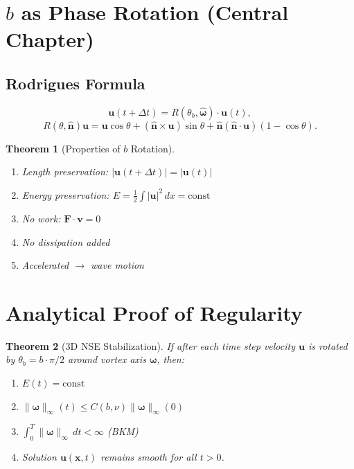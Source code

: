 \documentclass[11pt,a4paper]{article}
\newtheorem{theorem}{Theorem}[section]
\begin{document}
\section{$b$ as Phase Rotation (Central Chapter)}

\subsection{Rodrigues Formula}

\begin{equation}
\mathbf{u}(t+\Delta t) = R(\theta_b, \hat{\boldsymbol{\omega}})\cdot\mathbf{u}(t),
\end{equation}
\begin{equation}
R(\theta, \hat{\mathbf{n}})\mathbf{u} = \mathbf{u}\cos\theta + (\hat{\mathbf{n}}\times\mathbf{u})\sin\theta + \hat{\mathbf{n}}(\hat{\mathbf{n}}\cdot\mathbf{u})(1-\cos\theta).
\end{equation}

\begin{theorem}[Properties of $b$ Rotation]
\begin{enumerate}
    \item Length preservation: $|\mathbf{u}(t+\Delta t)| = |\mathbf{u}(t)|$
    \item Energy preservation: $E = \frac{1}{2}\int|\mathbf{u}|^2\,dx = \mathrm{const}$
    \item No work: $\mathbf{F}\cdot\mathbf{v} = 0$
    \item No dissipation added
    \item Accelerated $\to$ wave motion
\end{enumerate}
\end{theorem}

\section{Analytical Proof of Regularity}

\begin{theorem}[3D NSE Stabilization]
If after each time step velocity $\mathbf{u}$ is rotated by $\theta_b = b\cdot\pi/2$ around vortex axis $\boldsymbol{\omega}$, then:
\begin{enumerate}
    \item $E(t) = \mathrm{const}$
    \item $\|\boldsymbol{\omega}\|_\infty(t) \leq C(b,\nu)\|\boldsymbol{\omega}\|_\infty(0)$
    \item $\int_0^T \|\boldsymbol{\omega}\|_\infty\,dt < \infty$ (BKM)
    \item Solution $\mathbf{u}(\mathbf{x},t)$ remains smooth for all $t > 0$.
\end{enumerate}
\end{theorem}
\end{document}
